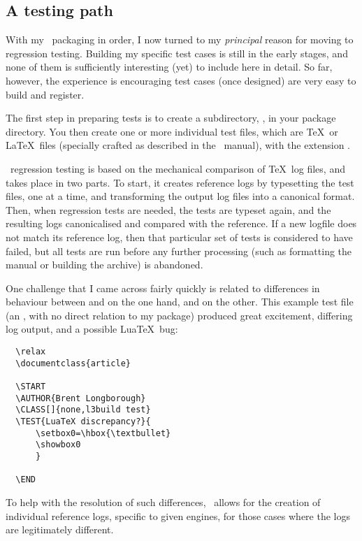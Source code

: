 \subsection{A testing path}
\label{sec:testing-path}

With my \CTAN\ packaging in order,
I now turned to my \emph{principal} reason for
moving to \lbuild \Dash regression testing.
Building my specific test cases is still in the early stages,
and none of them is sufficiently interesting (yet)
to include here in detail.
So far, however, the experience is encouraging \Dash
test cases (once designed) are very easy to build and register.

The first step in preparing tests is to create a subdirectory,
, in your package directory.
You then create one or more individual test files,
which are \TeX\ or \LaTeX\ files
(specially crafted as described in the \lbuild\ manual),
with the extension .

\lbuild\ regression testing is based on the mechanical
comparison of \TeX\ log files, and
takes place in two parts.
To start, it creates reference logs by typesetting
the test files, one at a time,
and transforming the output log files into a canonical format.
Then, when regression tests are needed,
the tests are typeset again, and the resulting logs canonicalised
and compared with the reference.
If a new logfile does not match its reference log,
then that particular set of tests is considered to have failed,
but all tests are run before any further processing
(such as formatting the manual or building the archive)
is abandoned.

One challenge that I came across fairly quickly is related to
differences in behaviour between  and  on the one hand, and  on the other.
This example test file
(an , with no direct relation to my package)
produced great excitement, differing log output,
and a possible Lua\TeX\ bug:

\begin{verbatim}
  \relax
  \documentclass{article}
  
  \START
  \AUTHOR{Brent Longborough}
  \CLASS[]{none,l3build test}
  \TEST{LuaTeX discrepancy?}{
      \setbox0=\hbox{\textbullet}
      \showbox0
      }
  
  \END
\end{verbatim}

To help with the resolution of such differences,
\lbuild\ allows for the creation of individual reference logs,
specific to given engines,
for those cases where the logs are legitimately different.

